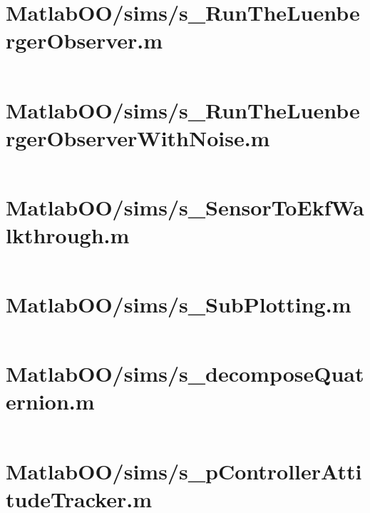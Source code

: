 \pagebreak
\section{MatlabOO/sims/s\_RunTheLuenbergerObserver.m}\label{code:MatlabOO/sims/s_RunTheLuenbergerObserver.m}
\inputminted[linenos,fontsize=\scriptsize]{matlab}{/home/dcouture/git/mathyourlife/TSatPy/beta_versions/matlab_object_oriented/sims/s_RunTheLuenbergerObserver.m}

\pagebreak
\section{MatlabOO/sims/s\_RunTheLuenbergerObserverWithNoise.m}\label{code:MatlabOO/sims/s_RunTheLuenbergerObserverWithNoise.m}
\inputminted[linenos,fontsize=\scriptsize]{matlab}{/home/dcouture/git/mathyourlife/TSatPy/beta_versions/matlab_object_oriented/sims/s_RunTheLuenbergerObserverWithNoise.m}

\pagebreak
\section{MatlabOO/sims/s\_SensorToEkfWalkthrough.m}\label{code:MatlabOO/sims/s_SensorToEkfWalkthrough.m}
\inputminted[linenos,fontsize=\scriptsize]{matlab}{/home/dcouture/git/mathyourlife/TSatPy/beta_versions/matlab_object_oriented/sims/s_SensorToEkfWalkthrough.m}

\pagebreak
\section{MatlabOO/sims/s\_SubPlotting.m}\label{code:MatlabOO/sims/s_SubPlotting.m}
\inputminted[linenos,fontsize=\scriptsize]{matlab}{/home/dcouture/git/mathyourlife/TSatPy/beta_versions/matlab_object_oriented/sims/s_SubPlotting.m}

\pagebreak
\section{MatlabOO/sims/s\_decomposeQuaternion.m}\label{code:MatlabOO/sims/s_decomposeQuaternion.m}
\inputminted[linenos,fontsize=\scriptsize]{matlab}{/home/dcouture/git/mathyourlife/TSatPy/beta_versions/matlab_object_oriented/sims/s_decomposeQuaternion.m}

\pagebreak
\section{MatlabOO/sims/s\_pControllerAttitudeTracker.m}\label{code:MatlabOO/sims/s_pControllerAttitudeTracker.m}
\inputminted[linenos,fontsize=\scriptsize]{matlab}{/home/dcouture/git/mathyourlife/TSatPy/beta_versions/matlab_object_oriented/sims/s_pControllerAttitudeTracker.m}

